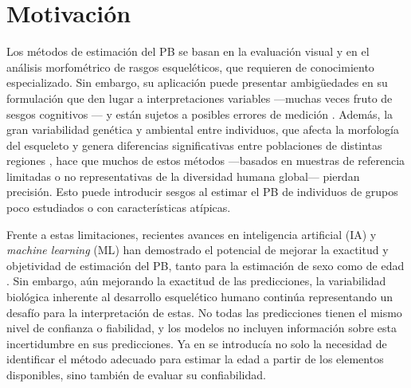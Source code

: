 
\section{Motivación}

Los métodos de estimación del \acrshort{PB} se basan en la evaluación visual y en el análisis morfométrico de rasgos esqueléticos, que requieren de conocimiento especializado. Sin embargo, su aplicación puede presentar ambigüedades en su formulación que den lugar a interpretaciones variables ---muchas veces fruto de sesgos cognitivos \cite{nakhaeizadeh2014, cooper2019}--- y están sujetos a posibles errores de medición \cite{langley2018}. Además, la gran variabilidad genética y ambiental entre individuos, que afecta la morfología del esqueleto y genera diferencias significativas entre poblaciones de distintas regiones \cite{ubelaker2017}, hace que muchos de estos métodos ---basados en muestras de referencia limitadas o no representativas de la diversidad humana global--- pierdan precisión. Esto puede introducir sesgos al estimar el \acrshort{PB} de individuos de grupos poco estudiados o con características atípicas.

Frente a estas limitaciones, recientes avances en inteligencia artificial (\acrshort{IA}) y \textit{machine learning} (\acrshort{ML}) han demostrado el potencial de mejorar la exactitud y objetividad de estimación del \acrshort{PB}, tanto para la estimación de sexo \cite{curate2017, darmawan2015, pinto2016, venema2022, park2024} como de edad \cite{kim2017, larson2018, lee2017, imaizumi2021, stepanovsky2024, park2024}. 
Sin embargo, aún mejorando la exactitud de las predicciones, la variabilidad biológica inherente al desarrollo esquelético humano continúa representando un desafío para la interpretación de estas. No todas las predicciones tienen el mismo nivel de confianza o fiabilidad, y los modelos no incluyen información sobre esta incertidumbre en sus predicciones. Ya en \cite{ferrante2009} se introducía no solo la necesidad de identificar el método adecuado para estimar la edad a partir de los elementos disponibles, sino también de evaluar su confiabilidad. 


